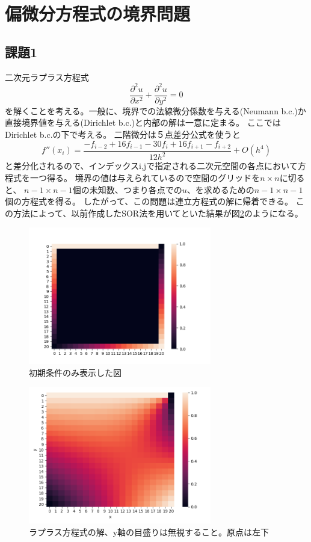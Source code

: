 \documentclass{jsarticle}
\begin{document}
\section{偏微分方程式の境界問題}
\subsection{課題1}
二次元ラプラス方程式
\begin{equation}
    \frac{\partial^2u}{\partial x^2} +     \frac{\partial^2u}{\partial y^2} = 0
\end{equation}
を解くことを考える。一般に、境界での法線微分係数を与える(Neumann b.c.)か直接境界値を与える(Dirichlet b.c.)と内部の解は一意に定まる。
ここではDirichlet b.c.の下で考える。
二階微分は５点差分公式を使うと
\begin{equation}
    f''(x_i) = \frac{-f_{i-2}+16f_{i-1}-30f_{i}+16f_{i+1}-f_{i+2}}{12h^2} + O(h^4)
\end{equation}
と差分化されるので、インデックスi,jで指定される二次元空間の各点において方程式を一つ得る。
境界の値は与えられているので空間のグリッドを$n\times n$に切ると、
$n-1 \times n-1$個の未知数、つまり各点での$u$、を求めるための$n-1 \times n-1$個の方程式を得る。
したがって、この問題は連立方程式の解に帰着できる。
この方法によって、以前作成したSOR法を用いてといた結果が図\ref{fig:5}のようになる。
\begin{figure}[htbp]
    \includegraphics[clip,width=8.0cm]{./init.png}
    \caption{初期条件のみ表示した図}
    \label{fig:4}
\end{figure}
\begin{figure}[H]
    \includegraphics[clip,width=8.0cm]{./pde.png}
    \caption{ラプラス方程式の解、y軸の目盛りは無視すること。原点は左下}
    \label{fig:5}
\end{figure}
\end{document}
